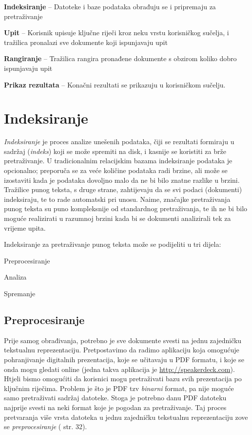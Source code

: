 \documentclass[a4paper,twoside,12pt]{scrreprt}
\begin{document}
\begin{compactenum}
  \item \textbf{Indeksiranje} – Datoteke i baze podataka obrađuju se i pripremaju za pretraživanje
  \item \textbf{Upit} – Korisnik upisuje ključne riječi kroz neku vrstu korisničkog sučelja, i tražilica pronalazi sve dokumente koji ispunjavaju upit
  \item \textbf{Rangiranje} – Tražilica rangira pronađene dokumente s obzirom koliko dobro ispunjavaju upit
  \item \textbf{Prikaz rezultata} – Konačni rezultati se prikazuju u korisničkom sučelju.
\end{compactenum}

\section{Indeksiranje}
\label{indexing}

\textit{Indeksiranje} je proces analize unešenih podataka, čiji se rezultati formiraju u sadržaj (\textit{indeks}) koji se može spremiti na disk, i kasnije se koristiti za brže pretraživanje. U tradicionalnim relacijskim bazama indeksiranje podataka je opcionalno; preporuča se za veće količine podataka radi brzine, ali može se izostaviti kada je podataka dovoljno malo da ne bi bilo znatne razlike u brzini. Tražilice punog teksta, s druge strane, zahtijevaju da se svi podaci (dokumenti) indeksiraju, te to rade automatski pri unosu. Naime, značajke pretraživanja punog teksta su puno kompleksnije od standardnog pretraživanja, te ih ne bi bilo moguće realizirati u razumnoj brzini kada bi se dokumenti analizirali tek za vrijeme upita.

Indeksiranje za pretraživanje punog teksta može se podijeliti u tri dijela:

\begin{compactenum}
  \item Preprocesiranje
  \item Analiza
  \item Spremanje
\end{compactenum}

\subsection{Preprocesiranje}

Prije samog obrađivanja, potrebno je sve dokumente svesti na jednu zajedničku tekstualnu reprezentaciju. Pretpostavimo da radimo aplikaciju koja omogućuje pohranjivanje digitalnih prezentacija, koje se učitavaju u PDF formatu, i koje se onda mogu gledati online (jedna takva aplikacija je \url{http://speakerdeck.com}). Htjeli bismo omogućiti da korisnici mogu pretraživati bazu svih prezentacija po ključnim riječima. Problem je što je PDF tzv \textit{binarni} format, pa nije moguće samo pretraživati sadržaj datoteke. Stoga je potrebno danu PDF datoteku najprije svesti na neki format koje je pogodan za pretraživanje. Taj proces pretvaranja više vrsta datoteka u jednu zajedničku tekstualnu reprezentaciju zove se \textit{preprocesiranje} (\cite{taming} str. 32).
\end{document}
